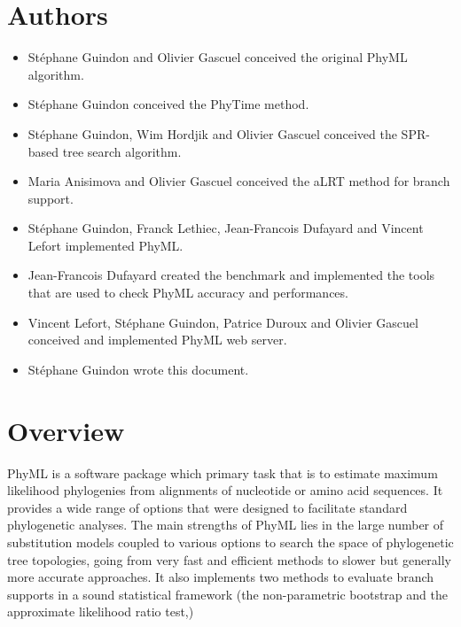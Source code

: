 \documentclass[a4paper,12pt]{article}
\begin{document}
{
\noindent
\setlength{\baselineskip}{0.7\baselineskip}
\section{Authors}
\begin{itemize}
\item { St\'ephane Guindon} and { Olivier Gascuel} conceived the original PhyML algorithm.
\item { St\'ephane Guindon} conceived the PhyTime method.
\item { St\'ephane Guindon, Wim Hordjik} and { Olivier Gascuel} conceived the SPR-based tree search algorithm.
\item { Maria Anisimova} and { Olivier Gascuel} conceived the aLRT method for branch support.
\item { St\'ephane Guindon, Franck Lethiec}, Jean-Francois Dufayard and Vincent Lefort implemented PhyML.
\item { Jean-Francois Dufayard} created the benchmark and implemented the tools that are used to check
  PhyML accuracy and performances. 
\item { Vincent Lefort, St\'ephane Guindon, Patrice Duroux} and { Olivier Gascuel} conceived and
  implemented PhyML web server.
\item St\'ephane Guindon wrote this document.
\end{itemize}
}
\clearpage

\section{Overview}

PhyML  \cite{guindon03} is  a  software  package which  primary  task that  is  to estimate  maximum
likelihood phylogenies  from alignments of nucleotide or  amino acid sequences.  It  provides a wide
range  of  options that  were  designed  to facilitate  standard  phylogenetic  analyses.  The  main
strengths of  PhyML lies in the  large number of substitution  models coupled to  various options to
search the  space of phylogenetic  tree topologies,  going from very  fast and efficient  methods to
slower but  generally more accurate approaches.  It  also implements two methods  to evaluate branch
supports  in  a  sound statistical  framework  (the  non-parametric  bootstrap and  the  approximate
likelihood ratio test,)
\end{document}
